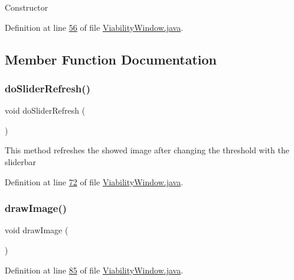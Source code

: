 Constructor 

Definition at line \hyperlink{_viability_window_8java_source_l00056}{56} of file \hyperlink{_viability_window_8java_source}{Viability\+Window.\+java}.



\subsection{Member Function Documentation}
\hypertarget{classgui_1_1_viability_window_a7db6c32207f03c20a1b7932a5f804435}{}\label{classgui_1_1_viability_window_a7db6c32207f03c20a1b7932a5f804435} 
\subsubsection{\texorpdfstring{do\+Slider\+Refresh()}{doSliderRefresh()}}
{\footnotesize\ttfamily void do\+Slider\+Refresh (\begin{DoxyParamCaption}{ }\end{DoxyParamCaption})\hspace{0.3cm}{\ttfamily [private]}}

This method refreshes the showed image after changing the threshold with the sliderbar 

Definition at line \hyperlink{_viability_window_8java_source_l00072}{72} of file \hyperlink{_viability_window_8java_source}{Viability\+Window.\+java}.

\hypertarget{classgui_1_1_viability_window_af3a8c3ee2b9b6c5c415df634105b5945}{}\label{classgui_1_1_viability_window_af3a8c3ee2b9b6c5c415df634105b5945} 
\subsubsection{\texorpdfstring{draw\+Image()}{drawImage()}}
{\footnotesize\ttfamily void draw\+Image (\begin{DoxyParamCaption}{ }\end{DoxyParamCaption})\hspace{0.3cm}{\ttfamily [protected]}}



Definition at line \hyperlink{_viability_window_8java_source_l00085}{85} of file \hyperlink{_viability_window_8java_source}{Viability\+Window.\+java}.

